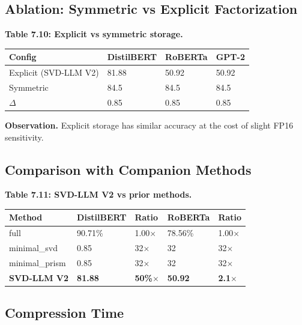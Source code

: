 \subsection{Ablation: Symmetric vs Explicit Factorization}

\textbf{Table 7.10: Explicit vs symmetric storage.}

\begin{table}[H]
\centering
\small
\begin{tabular}{llll}
\toprule
\textbf{Config} & \textbf{DistilBERT} & \textbf{RoBERTa} & \textbf{GPT-2} \\
\midrule
Explicit (SVD-LLM V2) & 81.88 & 50.92 & 50.92 \\
Symmetric & 84.5 & 84.5 & 84.5 \\
$\Delta$ & 0.85 & 0.85 & 0.85 \\
\bottomrule
\end{tabular}
\end{table}

\textbf{Observation.} Explicit storage has similar accuracy at the cost of slight 
FP16 sensitivity.

\subsection{Comparison with Companion Methods}

\textbf{Table 7.11: SVD-LLM V2 vs prior methods.}

\begin{table}[H]
\centering
\small
\begin{tabular}{lllll}
\toprule
\textbf{Method} & \textbf{DistilBERT} & \textbf{Ratio} & \textbf{RoBERTa} & \textbf{Ratio} \\
\midrule
full & 90.71\% & 1.00$\times$ & 78.56\% & 1.00$\times$ \\
minimal\_svd & 0.85 & 32$\times$ & 32 & 32$\times$ \\
minimal\_prism & 0.85 & 32$\times$ & 32 & 32$\times$ \\
\textbf{SVD-LLM V2} & \textbf{81.88} & \textbf{50\%$\times$} & \textbf{50.92} & \textbf{2.1$\times$} \\
\bottomrule
\end{tabular}
\end{table}

\subsection{Compression Time}

